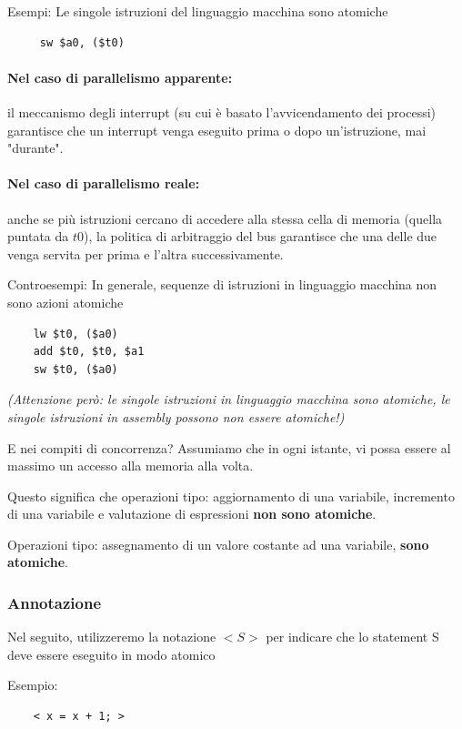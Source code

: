 Esempi:
Le singole istruzioni del linguaggio macchina sono atomiche
\begin{lstlisting}
     sw $a0, ($t0)
\end{lstlisting}

\paragraph{Nel caso di parallelismo apparente:}il meccanismo degli interrupt (su cui è basato l'avvicendamento dei processi) garantisce che un interrupt venga eseguito prima o dopo un'istruzione, mai "durante".

\paragraph{Nel caso di parallelismo reale:} anche se più istruzioni cercano di accedere alla stessa cella di
memoria (quella puntata da $t0$), la politica di arbitraggio del bus garantisce che una delle due venga servita per prima e l'altra
successivamente.
\newline

Controesempi:
In generale, sequenze di istruzioni in linguaggio macchina non
sono azioni atomiche
\begin{lstlisting}
    lw $t0, ($a0)
    add $t0, $t0, $a1
    sw $t0, ($a0)
\end{lstlisting}
\textit{(Attenzione però: le singole istruzioni in linguaggio macchina sono atomiche, le singole istruzioni in assembly possono non essere atomiche!)}
\newline

E nei compiti di concorrenza?
Assumiamo che in ogni istante, vi possa essere al massimo un accesso alla memoria alla volta.

Questo significa che operazioni tipo: aggiornamento di una variabile, incremento di una variabile e valutazione di espressioni
\textbf{non sono atomiche}.

Operazioni tipo: assegnamento di un valore costante ad una variabile, \textbf{sono atomiche}.

\subsubsection{Annotazione}
Nel seguito, utilizzeremo la notazione \textbf{$<S>$} per indicare che lo statement S deve essere eseguito in modo atomico
\newline

Esempio:
\begin{lstlisting}
    < x = x + 1; >
\end{lstlisting}

